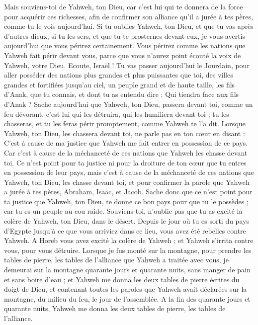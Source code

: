 \begin{multicols}{2}
Mais souviens-toi de Yahweh, ton Dieu, car c'est lui qui te donnera de la force pour acquérir ces richesses, afin de confirmer son alliance qu'il a jurée à tes pères, comme tu le vois aujourd’hui.
Si tu oublies Yahweh, ton Dieu, et que tu vas après d’autres dieux, si tu les sers, et que tu te prosternes devant eux, je vous avertis aujourd’hui que vous périrez certainement.
Vous périrez comme les nations que Yahweh fait périr devant vous, parce que vous n'aurez point écouté la voix de Yahweh, votre Dieu.
\VerseOne{}Ecoute, Israël ! Tu vas passer aujourd'hui le Jourdain, pour aller posséder des nations plus grandes et plus puissantes que toi, des villes grandes et fortifiées jusqu'au ciel,
un peuple grand et de haute taille, les fils d’Anak, que tu connais, et dont tu as entendu dire : Qui tiendra face aux fils d’Anak ?
Sache aujourd'hui que Yahweh, ton Dieu, passera devant toi, comme un feu dévorant, c'est lui qui les détruira, qui les humiliera devant toi ; tu les chasseras, et tu les feras périr promptement, comme Yahweh te l'a dit.
Lorsque Yahweh, ton Dieu, les chassera devant toi, ne parle pas en ton cœur en disant : C'est à cause de ma justice que Yahweh me fait entrer en possession de ce pays. Car c'est à cause de la méchanceté de ces nations que Yahweh les chasse devant toi.
Ce n'est point pour ta justice ni pour la droiture de ton cœur que tu entres en possession de leur pays, mais c'est à cause de la méchanceté de ces nations que Yahweh, ton Dieu, les chasse devant toi, et pour confirmer la parole que Yahweh a jurée à tes pères, Abraham, Isaac, et Jacob.
Sache donc que ce n'est point pour ta justice que Yahweh, ton Dieu, te donne ce bon pays pour que tu le possèdes ; car tu es un peuple au cou raide.
Souviens-toi, n'oublie pas que tu as excité la colère de Yahweh, ton Dieu, dans le désert. Depuis le jour où tu es sorti du pays d'Egypte jusqu'à ce que vous arriviez dans ce lieu, vous avez été rebelles contre Yahweh.
A Horeb vous avez excité la colère de Yahweh ; et Yahweh s’irrita contre vous, pour vous détruire.
Lorsque je fus monté sur la montagne, pour prendre les tables de pierre, les tables de l'alliance que Yahweh a traitée avec vous, je demeurai sur la montagne quarante jours et quarante nuits, sans manger de pain et sans boire d'eau ;
et Yahweh me donna les deux tables de pierre écrites du doigt de Dieu, et contenant toutes les paroles que Yahweh avait déclarées sur la montagne, du milieu du feu, le jour de l'assemblée.
A la fin des quarante jours et quarante nuits, Yahweh me donna les deux tables de pierre, les tables de l'alliance.

\end{multicols}
